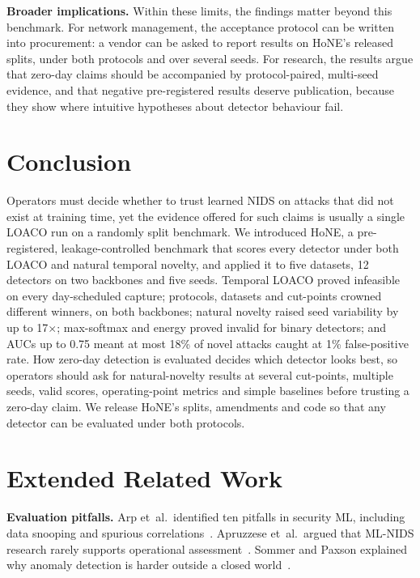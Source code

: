 \documentclass[conference]{IEEEtran}
\newif\ifappendix
\begin{document}
\textbf{Broader implications.} Within these limits, the findings matter beyond this benchmark. For network management, the acceptance protocol can be written into procurement: a vendor can be asked to report results on HoNE's released splits, under both protocols and over several seeds. For research, the results argue that zero-day claims should be accompanied by protocol-paired, multi-seed evidence, and that negative pre-registered results deserve publication, because they show where intuitive hypotheses about detector behaviour fail.

\section{Conclusion}
\label{sec:concl}
Operators must decide whether to trust learned NIDS on attacks that did not exist at training time, yet the evidence offered for such claims is usually a single LOACO run on a randomly split benchmark. We introduced HoNE, a pre-registered, leakage-controlled benchmark that scores every detector under both LOACO and natural temporal novelty, and applied it to five datasets, 12 detectors on two backbones and five seeds. Temporal LOACO proved infeasible on every day-scheduled capture; protocols, datasets and cut-points crowned different winners, on both backbones; natural novelty raised seed variability by up to 17$\times$; max-softmax and energy proved invalid for binary detectors; and AUCs up to 0.75 meant at most 18\% of novel attacks caught at 1\% false-positive rate. How zero-day detection is evaluated decides which detector looks best, so operators should ask for natural-novelty results at several cut-points, multiple seeds, valid scores, operating-point metrics and simple baselines before trusting a zero-day claim. We release HoNE's splits, amendments and code so that any detector can be evaluated under both protocols.




\ifappendix
\clearpage
\appendices

\section{Extended Related Work}
\label{app:related}
\textbf{Evaluation pitfalls.} Arp et~al.\ identified ten pitfalls in security ML, including data snooping and spurious correlations~\cite{arp2022}. Apruzzese et~al.\ argued that ML-NIDS research rarely supports operational assessment~\cite{apruzzese2023sok}. Sommer and Paxson explained why anomaly detection is harder outside a closed world~\cite{sommer2010}.
\end{document}
